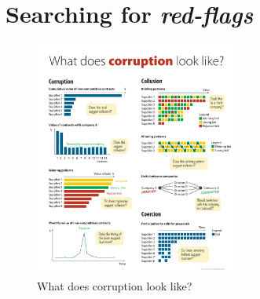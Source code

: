 \section{Searching for \textit{red-flags}}

\begin{figure}[H]
\begin{center}
\caption{What does corruption look like?}\includegraphics[max width=0.6\textwidth]{../img/poster_what.pdf}
\end{center}



\end{figure}
